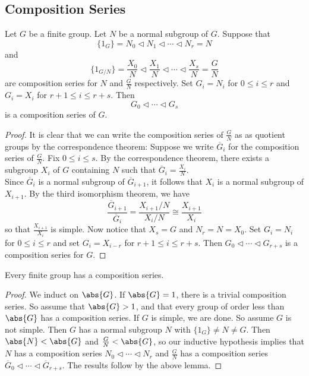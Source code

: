 \documentclass[a4paper]{article}
\begin{document}
\subsection{Composition Series}
\begin{lmm}{}{} Let $G$ be a finite group. Let $N$ be a normal subgroup of $G$. Suppose that $$\{1_G\}=N_0\triangleleft N_1\triangleleft\cdots\triangleleft N_r=N$$ and $$\{1_{G/N}\}=\frac{X_0}{N}\triangleleft\frac{X_1}{N}\triangleleft\cdots\triangleleft\frac{X_s}{N}=\frac{G}{N}$$ are composition series for $N$ and $\frac{G}{N}$ respectively. Set $G_i=N_i$ for $0\leq i\leq r$ and $G_i=X_i$ for $r+1\leq i\leq r+s$. Then $$G_0\triangleleft\cdots\triangleleft G_s$$ is a composition series of $G$. 
\begin{proof}
It is clear that we can write the composition series of $\frac{G}{N}$ as as quotient groups by the correspondence theorem: Suppose we write $\overline{G}_i$ for the composition series of $\frac{G}{N}$. Fix $0\leq i\leq s$. By the correspondence theorem, there exists a subgroup $X_i$ of $G$ containing $N$ such that $\overline{G}_i=\frac{X_i}{N}$. \\

Since $\overline{G}_i$ is a normal subgroup of $\overline{G}_{i+1}$, it follows that $X_i$ is a normal subgroup of $X_{i+1}$. By the third isomorphism theorem, we have $$\frac{\overline{G}_{i+1}}{\overline{G}_i}=\frac{X_{i+1}/N}{X_i/N}\cong\frac{X_{i+1}}{X_i}$$ so that $\frac{X_{i+1}}{X_i}$ is simple. Now notice that $X_s=G$ and $N_r=N=X_0$. Set $G_i=N_i$ for $0\leq i\leq r$ and set $G_i=X_{i-r}$ for $r+1\leq i\leq r+s$. Then $G_0\triangleleft\cdots\triangleleft G_{r+s}$ is a composition series for $G$.
\end{proof}
\end{lmm}

\begin{prp}{}{} Every finite group has a composition series. 
\begin{proof}
We induct on $\abs{G}$. If $\abs{G}=1$, there is a trivial composition series. So assume that $\abs{G}>1$, and that every group of order less than $\abs{G}$ has a composition series. If $G$ is simple, we are done. So assume $G$ is not simple. Then $G$ has a normal subgroup $N$ with $\{1_G\}\neq N\neq G$. Then $\abs{N}<\abs{G}$ and $\frac{G}{N}<\abs{G}$, so our inductive hypothesis implies that $N$ has a composition series $N_0\triangleleft\cdots\triangleleft N_r$ and $\frac{G}{N}$ has a composition series $\overline{G}_0\triangleleft\cdots\triangleleft\overline{G}_{r+s}$. The results follow by the above lemma. 
\end{proof}
\end{prp}
\end{document}
